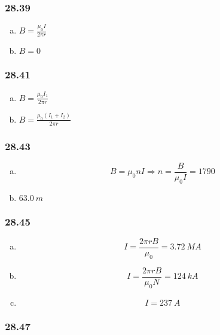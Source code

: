 \documentclass{article}
\begin{document}
\subsubsection{28.39}

\begin{enumerate}[(a)]
  \item $B = \frac{\mu_0 I}{2 \pi r}$

  \item $B = 0$
\end{enumerate}

\subsubsection{28.41}

\begin{enumerate}[(a)]
  \item $B = \frac{\mu_0 I_1}{2 \pi r}$

  \item $B = \frac{\mu_0 (I_1 + I_2)}{2 \pi r}$
\end{enumerate}

\subsubsection{28.43}

\begin{enumerate}[(a)]
  \item \[B = \mu_0 n I \Rightarrow n = \frac{B}{\mu_0 I} = 1790\]

  \item $\qty{63.0}{m}$
\end{enumerate}

\subsubsection{28.45}

\begin{enumerate}[(a)]
  \item \[I = \frac{2 \pi r B}{\mu_0} = \qty{3.72}{MA}\]

  \item \[I = \frac{2 \pi r B}{\mu_0 N} = \qty{124}{kA}\]

  \item \[I = \qty{237}{A}\]
\end{enumerate}

\subsubsection{28.47}
\end{document}
